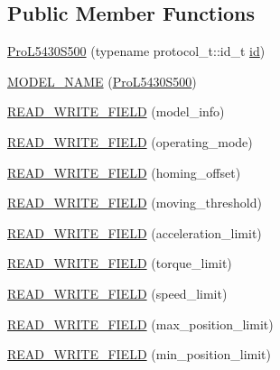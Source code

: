 \subsection*{Public Member Functions}
\begin{DoxyCompactItemize}
\item 
\hyperlink{classdynamixel_1_1servos_1_1_pro_l5430_s500_a56569e6572f13f72e644fa379c1e8949}{Pro\+L5430\+S500} (typename protocol\+\_\+t\+::id\+\_\+t \hyperlink{classdynamixel_1_1servos_1_1_servo_a2d022081672e25a7bb57b76706e1cc57}{id})
\item 
\hyperlink{classdynamixel_1_1servos_1_1_pro_l5430_s500_afc8971d8bbf06ad92ab092fe3a0eb975}{M\+O\+D\+E\+L\+\_\+\+N\+A\+ME} (\hyperlink{classdynamixel_1_1servos_1_1_pro_l5430_s500}{Pro\+L5430\+S500})
\item 
\hyperlink{classdynamixel_1_1servos_1_1_pro_l5430_s500_a96dc1a646262753c8dac0c3eb20557a2}{R\+E\+A\+D\+\_\+\+W\+R\+I\+T\+E\+\_\+\+F\+I\+E\+LD} (model\+\_\+info)
\item 
\hyperlink{classdynamixel_1_1servos_1_1_pro_l5430_s500_ae342547ca3ea1f1c1abf1c37cf5902e8}{R\+E\+A\+D\+\_\+\+W\+R\+I\+T\+E\+\_\+\+F\+I\+E\+LD} (operating\+\_\+mode)
\item 
\hyperlink{classdynamixel_1_1servos_1_1_pro_l5430_s500_a24039e822ce014472c671eb9e6086026}{R\+E\+A\+D\+\_\+\+W\+R\+I\+T\+E\+\_\+\+F\+I\+E\+LD} (homing\+\_\+offset)
\item 
\hyperlink{classdynamixel_1_1servos_1_1_pro_l5430_s500_a261ab053fd63cec68235549706f3189e}{R\+E\+A\+D\+\_\+\+W\+R\+I\+T\+E\+\_\+\+F\+I\+E\+LD} (moving\+\_\+threshold)
\item 
\hyperlink{classdynamixel_1_1servos_1_1_pro_l5430_s500_a1241009f2311c1e0c4854ee865de3086}{R\+E\+A\+D\+\_\+\+W\+R\+I\+T\+E\+\_\+\+F\+I\+E\+LD} (acceleration\+\_\+limit)
\item 
\hyperlink{classdynamixel_1_1servos_1_1_pro_l5430_s500_a2545c104ecea1fb52f07acae574fb2a3}{R\+E\+A\+D\+\_\+\+W\+R\+I\+T\+E\+\_\+\+F\+I\+E\+LD} (torque\+\_\+limit)
\item 
\hyperlink{classdynamixel_1_1servos_1_1_pro_l5430_s500_a46843b2792e307e7724e01c412e1f37c}{R\+E\+A\+D\+\_\+\+W\+R\+I\+T\+E\+\_\+\+F\+I\+E\+LD} (speed\+\_\+limit)
\item 
\hyperlink{classdynamixel_1_1servos_1_1_pro_l5430_s500_a8d813068cb6914d6c773590357c7ea7e}{R\+E\+A\+D\+\_\+\+W\+R\+I\+T\+E\+\_\+\+F\+I\+E\+LD} (max\+\_\+position\+\_\+limit)
\item 
\hyperlink{classdynamixel_1_1servos_1_1_pro_l5430_s500_ada9e56cfb52aa36e15dc3663645b7215}{R\+E\+A\+D\+\_\+\+W\+R\+I\+T\+E\+\_\+\+F\+I\+E\+LD} (min\+\_\+position\+\_\+limit)

\end{DoxyCompactItemize}
